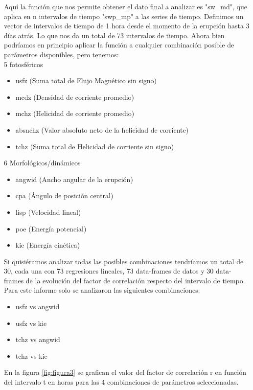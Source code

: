 \documentclass[12pt,a4paper,spanish]{article}
\begin{document}
Aquí la función que nos permite obtener el dato final a analizar es "sw\_md", que aplica en n intervalos de tiempo "swp\_mp" a las series de tiempo. Definimos un vector de intervalos de tiempo de 1 hora desde el momento de la erupción hasta 3 días atrás. Lo que nos da un total de 73 intervalos de tiempo. Ahora bien podríamos en principio aplicar la función a cualquier combinación posible de parámetros disponibles, pero tenemos:\\
\textbullet \hspace{1ex}5 fotosféricos 
\begin{itemize}
    \item usfz (Suma total de Flujo Magnético sin signo)
    \item mcdz (Densidad de corriente promedio)
    \item mchz (Helicidad de corriente promedio)
    \item absnchz (Valor absoluto neto de la helicidad de corriente)
    \item tchz (Suma total de Helicidad de corriente sin signo)
\end{itemize}
\noindent
\textbullet \hspace{1ex}6 Morfológicos/dinámicos
\begin{itemize}
    \item angwid (Ancho angular de la erupción)
    \item cpa (Ángulo de posición central)
    \item lisp (Velocidad lineal)
    \item poe (Energía potencial)
    \item kie (Energía cinética)
\end{itemize}

Si quisiéramos analizar todas las posibles combinaciones tendríamos un total de 30, cada una con 73 regresiones lineales, 73 data-frames de datos y 30 data-frames de la evolución del factor de correlación respecto del intervalo de tiempo. Para este informe solo se analizaron las siguientes combinaciones:
\begin{itemize}
    \item usfz vs angwid
    \item usfz vs kie
    \item tchz vs angwid
    \item tchz vs kie
\end{itemize}

En la figura \ref{fig:figura3} se grafican el valor del factor de correlación r en función del intervalo t en horas para las 4 combinaciones de parámetros seleccionadas.
\end{document}
